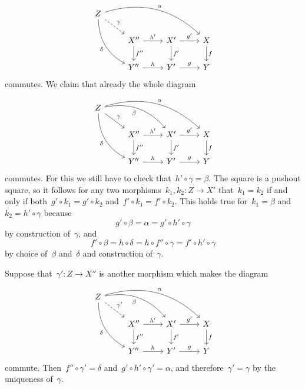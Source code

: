 \[
  \begin{tikzcd}
      Z
      \arrow[bend left]{drrr}[above right]{\alpha}
      \arrow[dashed]{dr}[above right]{\gamma}
      \arrow[bend right]{ddr}[below left]{\delta}
    & {}
    & {}
    & {}
    \\
      {}
    & X''
      \arrow{r}[above]{h'}
      \arrow{d}[right]{f''}
    & X'
      \arrow{r}[above]{g'}
      \arrow{d}[right]{f'}
    & X
      \arrow{d}[right]{f}
    \\
      {}
    & Y''
      \arrow{r}[above]{h}
    & Y'
      \arrow{r}[above]{g}
    & Y
  \end{tikzcd}
\]
commutes.
We claim that already the whole diagram
\[
  \begin{tikzcd}
      Z
      \arrow[bend left]{drrr}[above right]{\alpha}
      \arrow[bend left]{drr}[below left]{\beta}
      \arrow{dr}[above right]{\gamma}
      \arrow[bend right]{ddr}[below left]{\delta}
    & {}
    & {}
    & {}
    \\
      {}
    & X''
      \arrow{r}[above]{h'}
      \arrow{d}[right]{f''}
    & X'
      \arrow{r}[above]{g'}
      \arrow{d}[right]{f'}
    & X
      \arrow{d}[right]{f}
    \\
      {}
    & Y''
      \arrow{r}[above]{h}
    & Y'
      \arrow{r}[above]{g}
    & Y
  \end{tikzcd}
\]
commutes.
For this we still have to check that~$h' \circ \gamma = \beta$.
The  square is a pushout square, so it follows for any two morphisms~$k_1, k_2 \colon Z \to X'$ that~$k_1 = k_2$ if and only if both~$g' \circ k_1 = g' \circ k_2$ and~$f' \circ k_1 = f' \circ k_2$.
This holds true for~$k_1 = \beta$ and~$k_2 = h' \circ \gamma$ because
\[
    g' \circ \beta
  = \alpha
  = g' \circ h' \circ \gamma
\]
by construction of~$\gamma$, and
\[
    f' \circ \beta
  = h \circ \delta
  = h \circ f'' \circ \gamma
  = f' \circ h' \circ \gamma
\]
by choice of~$\beta$ and~$\delta$ and construction of~$\gamma$.

Suppose that~$\gamma' \colon Z \to X''$ is another morphism which makes the diagram
\[
  \begin{tikzcd}
      Z
      \arrow[bend left]{drrr}[above right]{\alpha}
      \arrow[bend left]{drr}[below left]{\beta}
      \arrow[dashed]{dr}[above right]{\gamma'}
      \arrow[bend right]{ddr}[below left]{\delta}
    & {}
    & {}
    & {}
    \\
      {}
    & X''
      \arrow{r}[above]{h'}
      \arrow{d}[right]{f''}
    & X'
      \arrow{r}[above]{g'}
      \arrow{d}[right]{f'}
    & X
      \arrow{d}[right]{f}
    \\
      {}
    & Y''
      \arrow{r}[above]{h}
    & Y'
      \arrow{r}[above]{g}
    & Y
  \end{tikzcd}
\]
commute.
Then~$f'' \circ \gamma' = \delta$ and~$g' \circ h' \circ \gamma' = \alpha$, and therefore~$\gamma' = \gamma$ by the uniqueness of~$\gamma$.




